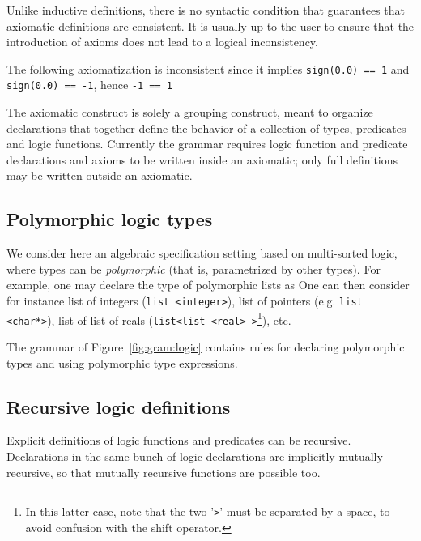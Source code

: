Unlike inductive definitions, there is no syntactic condition that
 guarantees that axiomatic definitions are consistent. It is usually
up to the user to ensure that the introduction of axioms does not lead
to a logical inconsistency.

\begin{example}
  The following axiomatization
  is inconsistent since
  it implies \lstinline|sign(0.0) == 1| and \lstinline|sign(0.0) == -1|,
  hence \lstinline|-1 == 1|
\end{example}

The axiomatic construct is solely a grouping construct, meant to organize declarations that together define the behavior of a collection of types, predicates and logic functions. Currently the grammar
requires logic function and predicate declarations and axioms to be written inside an axiomatic; only full definitions may be written outside an axiomatic.


\subsection{Polymorphic logic types}\label{sec:polym-logic-types}

We consider here an algebraic specification setting based on
multi-sorted logic, where types can be \emph{polymorphic} (that is,
parametrized by other types). For example, one may declare the type of
polymorphic lists as
One can then consider for
instance list of integers (\lstinline|list <integer>|), list of pointers
(e.g. \lstinline|list <char*>|), list of list of reals
(\lstinline|list<list <real> >|\footnote{In this latter case, note that the two
  '\texttt{>}' must be separated by a space, to avoid confusion with
  the shift operator.}), etc.

The grammar of Figure~\ref{fig:gram:logic} contains rules for
declaring polymorphic types and using polymorphic type
expressions.


\subsection{Recursive logic definitions}
Explicit definitions of logic functions and predicates can be
recursive. Declarations in the same bunch of logic declarations are
implicitly mutually recursive, so that mutually recursive functions are
possible too.

